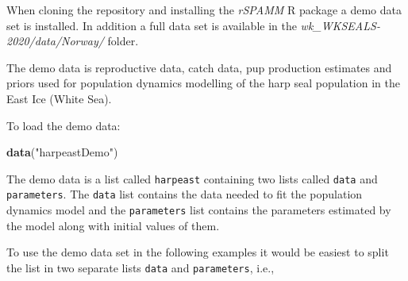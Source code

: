 \documentclass[
]{article}
\newenvironment{Shaded}{\begin{snugshade}}{\end{snugshade}}
\newcommand{\CommentTok}[1]{\textcolor[rgb]{0.56,0.35,0.01}{\textit{#1}}}
\newcommand{\KeywordTok}[1]{\textcolor[rgb]{0.13,0.29,0.53}{\textbf{#1}}}
\newcommand{\NormalTok}[1]{#1}
\newcommand{\OperatorTok}[1]{\textcolor[rgb]{0.81,0.36,0.00}{\textbf{#1}}}
\newcommand{\StringTok}[1]{\textcolor[rgb]{0.31,0.60,0.02}{#1}}
\begin{document}
When cloning the repository and installing the \emph{rSPAMM} R package a
demo data set is installed. In addition a full data set is available in
the \emph{wk\_WKSEALS-2020/data/Norway/} folder.

The demo data is reproductive data, catch data, pup production estimates
and priors used for population dynamics modelling of the harp seal
population in the East Ice (White Sea).

To load the demo data:

\begin{Shaded}
\begin{Highlighting}[]
\KeywordTok{data}\NormalTok{(}\StringTok{"harpeastDemo"}\NormalTok{)}
\end{Highlighting}
\end{Shaded}

The demo data is a list called \texttt{harpeast} containing two lists
called \texttt{data} and \texttt{parameters}. The \texttt{data} list
contains the data needed to fit the population dynamics model and the
\texttt{parameters} list contains the parameters estimated by the model
along with initial values of them.

\begin{Shaded}
\end{Shaded}

To use the demo data set in the following examples it would be easiest
to split the list in two separate lists \texttt{data} and
\texttt{parameters}, i.e.,

\begin{Shaded}
\end{Shaded}
\end{document}
